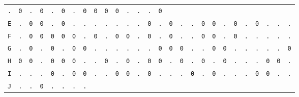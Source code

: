 \begin{figure}[H]
\begin{center}
{\begin{tabular}{c|cccccccccccccccccccccccccc}
				\texttt{.} & \texttt{0} & \texttt{.} & \texttt{0} &
				\texttt{.} & \texttt{0} & \texttt{.} & \texttt{0} &
				\texttt{0} & \texttt{0} & \texttt{0} & \texttt{.} &
				\texttt{.} & \texttt{.} & \texttt{0}                             \\
				\texttt{E} & \texttt{.} & \texttt{0} & \texttt{0} &
				\texttt{.} & \texttt{0} & \texttt{.} & \texttt{.} &
				\texttt{.} & \texttt{.} & \texttt{.} & \texttt{.} &
				\texttt{.} & \texttt{0} & \texttt{.} & \texttt{0} &
				\texttt{.} & \texttt{.} & \texttt{0} & \texttt{0} &
				\texttt{.} & \texttt{0} & \texttt{.} & \texttt{0} &
				\texttt{.} & \texttt{.} & \texttt{.}                             \\
				\texttt{F} & \texttt{.} & \texttt{0} & \texttt{0} &
				\texttt{0} & \texttt{0} & \texttt{0} & \texttt{.} &
				\texttt{0} & \texttt{.} & \texttt{0} & \texttt{0} &
				\texttt{.} & \texttt{0} & \texttt{.} & \texttt{0} &
				\texttt{.} & \texttt{.} & \texttt{0} & \texttt{0} &
				\texttt{.} & \texttt{0} & \texttt{.} & \texttt{.} &
				\texttt{.} & \texttt{.} & \texttt{.}                             \\
				\texttt{G} & \texttt{.} & \texttt{0} & \texttt{.} &
				\texttt{0} & \texttt{.} & \texttt{0} & \texttt{0} &
				\texttt{.} & \texttt{.} & \texttt{.} & \texttt{.} &
				\texttt{.} & \texttt{.} & \texttt{0} & \texttt{0} &
				\texttt{0} & \texttt{.} & \texttt{.} & \texttt{0} &
				\texttt{0} & \texttt{.} & \texttt{.} & \texttt{.} &
				\texttt{.} & \texttt{.} & \texttt{0}                             \\
				\texttt{H} & \texttt{0} & \texttt{0} & \texttt{.} &
				\texttt{0} & \texttt{0} & \texttt{0} & \texttt{.} &
				\texttt{.} & \texttt{0} & \texttt{.} & \texttt{0} &
				\texttt{.} & \texttt{0} & \texttt{0} & \texttt{.} &
				\texttt{0} & \texttt{.} & \texttt{0} & \texttt{.} &
				\texttt{0} & \texttt{.} & \texttt{.} & \texttt{.} &
				\texttt{0} & \texttt{0} & \texttt{.}                             \\
				\texttt{I} & \texttt{.} & \texttt{.} & \texttt{.} &
				\texttt{0} & \texttt{.} & \texttt{0} & \texttt{0} &
				\texttt{.} & \texttt{.} & \texttt{0} & \texttt{0} &
				\texttt{.} & \texttt{0} & \texttt{.} & \texttt{.} &
				\texttt{.} & \texttt{0} & \texttt{.} & \texttt{0} &
				\texttt{.} & \texttt{.} & \texttt{.} & \texttt{0} &
				\texttt{0} & \texttt{.} & \texttt{.}                             \\
				\texttt{J} & \texttt{.} & \texttt{.} & \texttt{0} &
				\texttt{.} & \texttt{.} & \texttt{.} & \texttt{.} &

\end{tabular}}
\end{center}
\end{figure}
